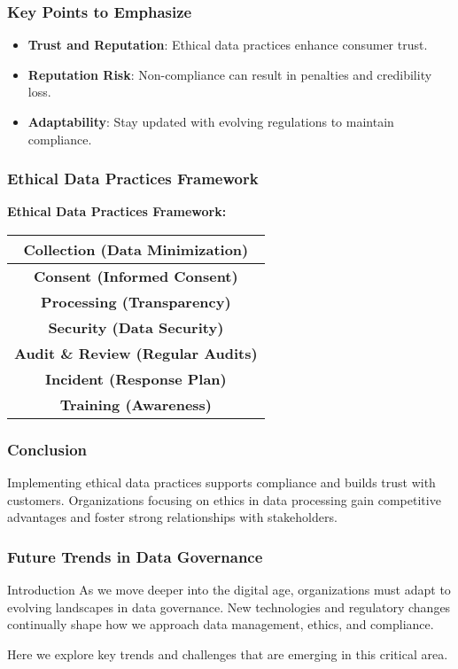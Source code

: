 \documentclass[aspectratio=169]{beamer}
\begin{document}
\begin{frame}
    \frametitle{Key Points to Emphasize}
    \begin{itemize}
        \item \textbf{Trust and Reputation}: Ethical data practices enhance consumer trust.
        \item \textbf{Reputation Risk}: Non-compliance can result in penalties and credibility loss.
        \item \textbf{Adaptability}: Stay updated with evolving regulations to maintain compliance.
    \end{itemize}
\end{frame}

\begin{frame}
    \frametitle{Ethical Data Practices Framework}
    \begin{center}
        \textbf{Ethical Data Practices Framework:}
        \begin{tabular}{|c|}
            \hline
            \textbf{Collection (Data Minimization)} \\
            \hline
            \textbf{Consent (Informed Consent)} \\
            \hline
            \textbf{Processing (Transparency)} \\
            \hline
            \textbf{Security (Data Security)} \\
            \hline
            \textbf{Audit \& Review (Regular Audits)} \\
            \hline
            \textbf{Incident (Response Plan)} \\
            \hline
            \textbf{Training (Awareness)} \\
            \hline
        \end{tabular}
    \end{center}
\end{frame}

\begin{frame}
    \frametitle{Conclusion}
    Implementing ethical data practices supports compliance and builds trust with customers. Organizations focusing on ethics in data processing gain competitive advantages and foster strong relationships with stakeholders.
\end{frame}

\begin{frame}[fragile]
    \frametitle{Future Trends in Data Governance}
    \begin{block}{Introduction}
        As we move deeper into the digital age, organizations must adapt to evolving landscapes in data governance. New technologies and regulatory changes continually shape how we approach data management, ethics, and compliance.
    \end{block}
    Here we explore key trends and challenges that are emerging in this critical area.
\end{frame}
\end{document}
